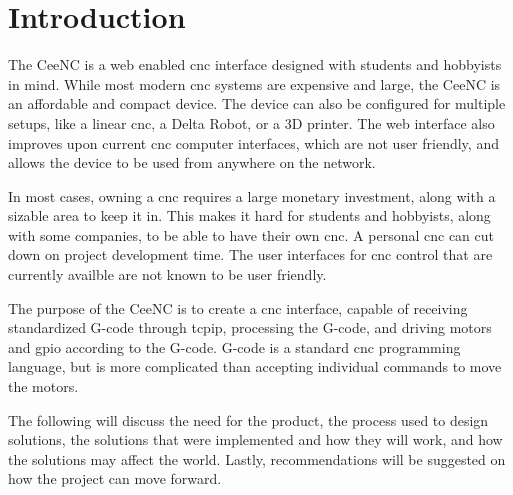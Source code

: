 \chapter{Introduction}

The CeeNC is a web enabled \gls{cnc} interface designed with students and hobbyists in mind. 
While most modern \gls{cnc} systems are expensive and large, the CeeNC is an affordable and compact device. 
The device can also be configured for multiple setups, like a linear \gls{cnc}, a Delta Robot, or a 3D printer. 
The web interface also improves upon current \gls{cnc} computer interfaces, which are not user friendly, and allows the device to be used from anywhere on the network.

In most cases, owning a \gls{cnc} requires a large monetary investment, along with a sizable area to keep it in. 
This makes it hard for students and hobbyists, along with some companies, to be able to have their own \gls{cnc}.
A personal \gls{cnc} can cut down on project development time.
The user interfaces for \gls{cnc} control that are currently availble are not known to be user friendly.

The purpose of the CeeNC is to create a \gls{cnc} interface, capable of receiving standardized G-code through \gls{tcpip}, processing the G-code, and driving motors and \gls{gpio} according to the G-code. 
G-code is a standard \gls{cnc} programming language, but is more complicated than accepting individual commands to move the motors.

The following will discuss the need for the product, the process used to design solutions, the solutions that were implemented and how they will work, and how the solutions may affect the world.
Lastly, recommendations will be suggested on how the project can move forward.
